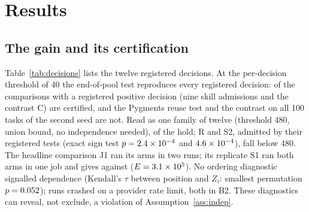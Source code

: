\documentclass[sigconf,review,anonymous]{acmart}
\begin{document}
\section{Results}
\subsection{The gain and its certification}\label{sec:gain}
Table~\ref{tab:decisions} lists the twelve registered decisions. At the per-decision threshold of 40
the end-of-pool test reproduces every registered decision: \neopHeldForty{} of the \neopRegN{}
comparisons with a registered positive decision (nine skill admissions and the contrast C) are certified, and the Pygments reuse test and the contrast on
all 100 tasks of the second seed are not. Read as one family of twelve (threshold 480, union bound,
no independence needed), \neopHeldFam{} of the \neopRegN{} hold; R and S2, admitted by their
registered tests (exact sign test $p=2.4\times10^{-4}$ and $4.6\times10^{-4}$), fall below 480. The headline comparison J1 ran its
arms in two runs; its replicate S1 ran both arms in one job and gives \nsdSkill{} against
\nsdNone{} ($E=3.1\times10^{5}$). No ordering diagnostic signalled dependence (Kendall's $\tau$ between
position and $Z_i$: smallest permutation $p=0.052$); \neopRateCrash{} runs crashed on a
provider rate limit, both in B2. These diagnostics can reveal, not exclude, a violation of
Assumption~\ref{ass:indep}.
\end{document}
